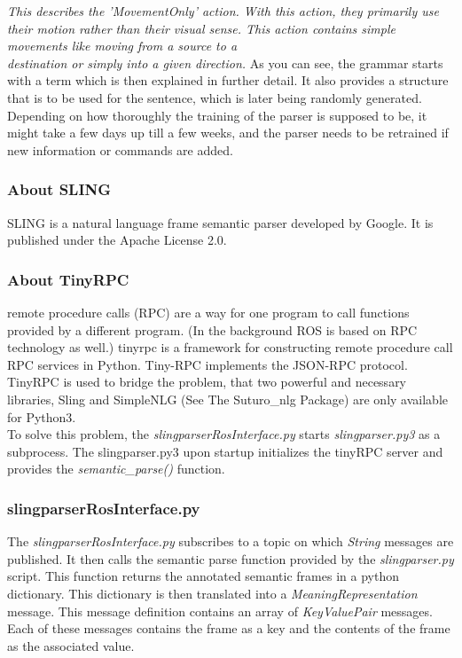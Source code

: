 \documentclass[main.tex]{subfiles}
\begin{document}
            \textit{This describes the 'MovementOnly' action.
                With this action, they primarily use their motion rather than their visual sense. This action contains simple movements like moving from a source to a\\ destination or simply into a given direction.}            
            As you can see, the grammar starts with a term which is then explained in further detail. It also provides a structure that is to be used for the sentence, which is later being randomly generated.\\ 
            Depending on how thoroughly the training of the parser is supposed to be, it might take a few days up till a few weeks, and the parser needs to be retrained if new information or commands are added.
        
        \subsubsection{About SLING}
            SLING is a natural language frame semantic parser developed by Google. It is published under the Apache License 2.0.
        \subsubsection{About TinyRPC}
             remote procedure calls (RPC) are a way for one program to call functions provided by a different program. (In the background ROS is based on RPC technology as well.) tinyrpc is a framework for constructing remote procedure call RPC services in Python. Tiny-RPC implements the JSON-RPC protocol.\\
             TinyRPC is used to bridge the problem, that two powerful and necessary libraries, Sling and SimpleNLG (See The Suturo\_nlg Package) are only available for Python3.\\
             To solve this problem, the \textit{slingparserRosInterface.py} starts \textit{slingparser.py3} as a subprocess. The slingparser.py3 upon startup initializes the tinyRPC server and provides the \textit{semantic\_parse()} function.
        \subsubsection[slingparserros]{slingparserRosInterface.py}
            The \textit{slingparserRosInterface.py} subscribes to a topic on which \textit{String} messages are published. It then calls the semantic parse function provided by the \textit{slingparser.py} script. This function returns the annotated semantic frames in a python dictionary. This dictionary is then translated into a \textit{MeaningRepresentation} message. This message definition contains an array of \textit{KeyValuePair} messages. Each of these messages contains the frame as a key and the contents of the frame as the associated value.
\end{document}
